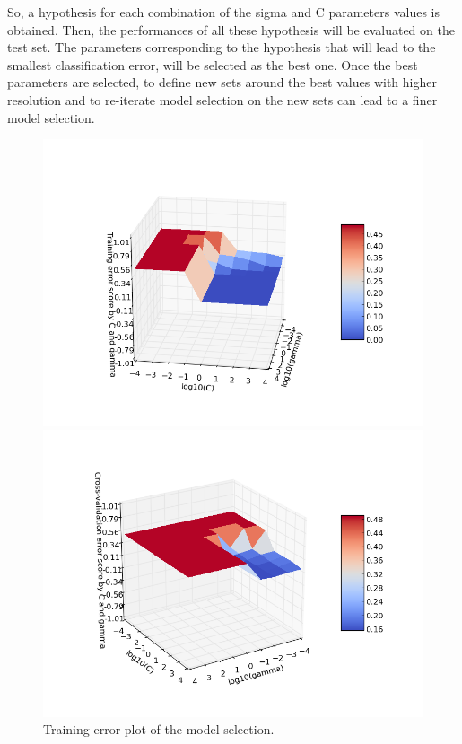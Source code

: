 \documentclass[aps,letterpaper,10pt]{revtex4}
\begin{document}
So, a hypothesis for each combination of the sigma and C parameters values is obtained. Then, the performances of all these hypothesis will be evaluated on the test set. The parameters corresponding to the hypothesis that will lead to the smallest classification error, will be selected as the best one. Once the best parameters are selected, to define new sets around the best values with higher resolution and to re-iterate model selection on the new sets can lead to a finer model selection. 

\begin{figure}[]
  \includegraphics[width=\linewidth]{img/tr_err_graph.png}
  \caption{Training error plot of the model selection.}\label{fig:4}
\endminipage\hfill
{}
  \includegraphics[width=\linewidth]{img/cv_err_graph.png}

\end{figure}
\end{document}

